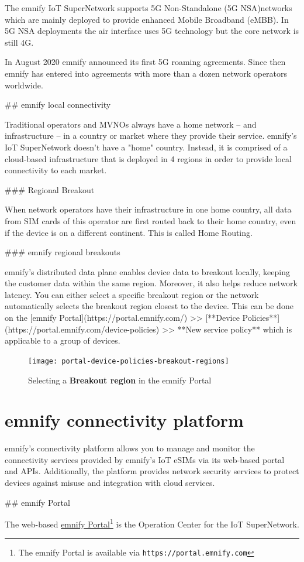 \documentclass[11pt, oneside]{article}   	%
\newcommand{\addspace}{\vspace{2mm}}
\newcommand{\removespace}{\vspace{-7mm}}
\begin{document}
\begin{markdown}
  The emnify IoT SuperNetwork supports 5G Non-Standalone (5G NSA)networks which are mainly deployed to provide enhanced Mobile Broadband (eMBB).
  In 5G NSA deployments the air interface uses 5G technology but the core network is still 4G.
  
  In August 2020 emnify announced its first 5G roaming agreements.
  Since then emnify has entered into agreements with more than a dozen network operators worldwide.

## emnify local connectivity

Traditional operators and MVNOs always have a home network -- and infrastructure -- in a country or market where they provide their service. 
emnify's IoT SuperNetwork doesn't have a "home" country.
Instead, it is comprised of a cloud-based infrastructure that is deployed in 4 regions in order to provide local connectivity to each market. 

### Regional Breakout 

When network operators have their infrastructure in one home country, all data from SIM cards of this operator are first routed back to their home country, even if the device is on a different continent.
This is called Home Routing.


### emnify regional breakouts

emnify's distributed data plane enables device data to breakout locally, keeping the customer data within the same region.
Moreover, it also helps reduce network latency.
You can either select a specific breakout region or the network automatically selects the breakout region closest to the device.
This can be done on the [emnify Portal](https://portal.emnify.com/) >> [**Device Policies**](https://portal.emnify.com/device-policies) >> **New service policy** which is applicable to a group of devices.

\end{markdown}
\addspace
\begin{figure}[h]
  \texttt{[image: portal-device-policies-breakout-regions]}
  \removespace
  \caption{Selecting a \textbf{Breakout region} in the emnify Portal}
\end{figure}

\section{emnify connectivity platform}

\begin{markdown}

emnify's connectivity platform allows you to manage and monitor the connectivity services provided by emnify's IoT eSIMs via its web-based portal and APIs.
Additionally, the platform provides network security services to protect devices against misuse and integration with cloud services.

## emnify Portal

\end{markdown}
The web-based \href{https://portal.emnify.com}{emnify Portal}\footnote{The emnify Portal is available via  \texttt{https://portal.emnify.com}} is the Operation Center for the IoT SuperNetwork.
\end{document}
